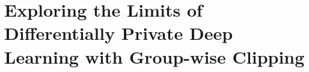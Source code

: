 \chapter[Exploring the Limits of Differentially Private Deep Learning \\with Group-wise Clipping]{\Large Exploring the Limits of Differentially Private Deep Learning with Group-wise Clipping}\label{ch_4}
